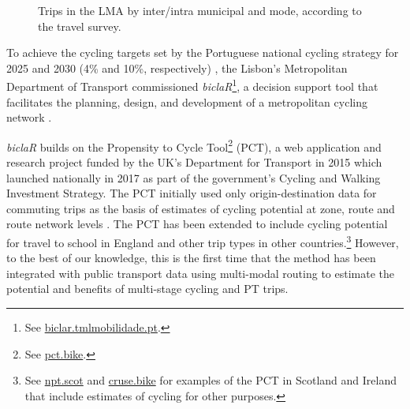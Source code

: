 \documentclass[review, doubleblind, 3p,
authoryear]{elsarticle} %
\begin{document}
\begin{figure}
\caption{\label{mododist}Trips in the LMA by inter/intra municipal and mode, according to the travel survey.}\label{fig:mododist}
\end{figure}

To achieve the cycling targets set by the Portuguese national cycling
strategy for 2025 and 2030 (4\% and 10\%, respectively) \citep{ENMAC},
the Lisbon's Metropolitan Department of Transport commissioned
\emph{biclaR}\footnote{See
  \href{https://biclar.tmlmobilidade.pt/}{biclar.tmlmobilidade.pt}.}, a
decision support tool that facilitates the planning, design, and
development of a metropolitan cycling network \citep{felix2023}.

\emph{biclaR} builds on the Propensity to Cycle Tool\footnote{See
  \href{https://www.pct.bike/}{pct.bike}.} (PCT), a web application and
research project funded by the UK's Department for Transport in 2015
which launched nationally in 2017 as part of the government's Cycling
and Walking Investment Strategy. The PCT initially used only
origin-destination data for commuting trips as the basis of estimates of
cycling potential at zone, route and route network levels
\citep{lovelace2017}. The PCT has been extended to include cycling
potential for travel to school in England \citep{goodman2019} and other
trip types in other countries.\footnote{See
  \href{https://www.npt.scot}{npt.scot} and
  \href{https://cruse.bike}{cruse.bike} for examples of the PCT in
  Scotland and Ireland that include estimates of cycling for other
  purposes.} However, to the best of our knowledge, this is the first
time that the method has been integrated with public transport data
using multi-modal routing to estimate the potential and benefits of
multi-stage cycling and PT trips.
\end{document}
